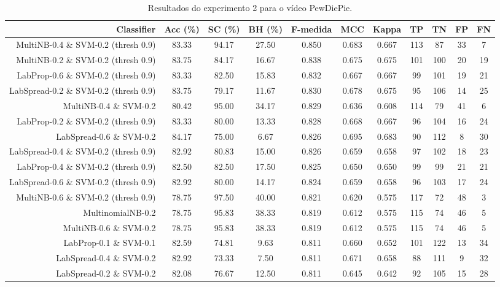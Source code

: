 \begin{table}[!htb]
\centering
\caption{Resultados do experimento 2 para o vídeo PewDiePie.}
\label{tab:PewDiePie}
\begin{tabular}{r|c|c|c|c|c|c|c|c|c|c}
\hline\hline
Classifier & Acc (\%) & SC (\%) & BH (\%) & F-medida & MCC & Kappa & TP & TN & FP & FN \\ \hline
MultiNB-0.4 \& SVM-0.2 (thresh 0.9) & 83.33 & 94.17 & 27.50 & 0.850 & 0.683 & 0.667 & 113 & 87 & 33 & 7 \\ 
MultiNB-0.2 \& SVM-0.2 (thresh 0.9) & 83.75 & 84.17 & 16.67 & 0.838 & 0.675 & 0.675 & 101 & 100 & 20 & 19 \\ 
LabProp-0.6 \& SVM-0.2 (thresh 0.9) & 83.33 & 82.50 & 15.83 & 0.832 & 0.667 & 0.667 & 99 & 101 & 19 & 21 \\ 
LabSpread-0.2 \& SVM-0.2 (thresh 0.9) & 83.75 & 79.17 & 11.67 & 0.830 & 0.678 & 0.675 & 95 & 106 & 14 & 25 \\ 
MultiNB-0.4 \& SVM-0.2 & 80.42 & 95.00 & 34.17 & 0.829 & 0.636 & 0.608 & 114 & 79 & 41 & 6 \\ 
LabProp-0.2 \& SVM-0.2 (thresh 0.9) & 83.33 & 80.00 & 13.33 & 0.828 & 0.668 & 0.667 & 96 & 104 & 16 & 24 \\ 
LabSpread-0.6 \& SVM-0.2 & 84.17 & 75.00 & 6.67 & 0.826 & 0.695 & 0.683 & 90 & 112 & 8 & 30 \\ 
LabSpread-0.4 \& SVM-0.2 (thresh 0.9) & 82.92 & 80.83 & 15.00 & 0.826 & 0.659 & 0.658 & 97 & 102 & 18 & 23 \\ 
LabProp-0.4 \& SVM-0.2 (thresh 0.9) & 82.50 & 82.50 & 17.50 & 0.825 & 0.650 & 0.650 & 99 & 99 & 21 & 21 \\ 
LabSpread-0.6 \& SVM-0.2 (thresh 0.9) & 82.92 & 80.00 & 14.17 & 0.824 & 0.659 & 0.658 & 96 & 103 & 17 & 24 \\ 
MultiNB-0.6 \& SVM-0.2 (thresh 0.9) & 78.75 & 97.50 & 40.00 & 0.821 & 0.620 & 0.575 & 117 & 72 & 48 & 3 \\ 
MultinomialNB-0.2 & 78.75 & 95.83 & 38.33 & 0.819 & 0.612 & 0.575 & 115 & 74 & 46 & 5 \\ 
MultiNB-0.6 \& SVM-0.2 & 78.75 & 95.83 & 38.33 & 0.819 & 0.612 & 0.575 & 115 & 74 & 46 & 5 \\ 
LabProp-0.1 \& SVM-0.1 & 82.59 & 74.81 & 9.63 & 0.811 & 0.660 & 0.652 & 101 & 122 & 13 & 34 \\ 
LabSpread-0.4 \& SVM-0.2 & 82.92 & 73.33 & 7.50 & 0.811 & 0.671 & 0.658 & 88 & 111 & 9 & 32 \\ 
LabSpread-0.2 \& SVM-0.2 & 82.08 & 76.67 & 12.50 & 0.811 & 0.645 & 0.642 & 92 & 105 & 15 & 28 \\ 

\end{tabular}
\end{table}
